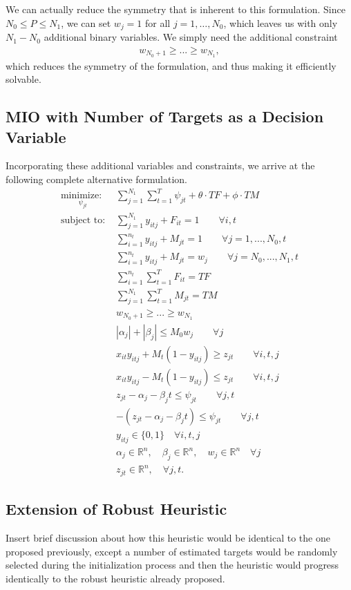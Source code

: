 We can actually reduce the symmetry that is inherent to this formulation. Since $N_{0} \leq P \leq N_{1}$, we can set $w_j=1$ for all $j=1,\ldots,N_0$, which leaves us with only $N_1-N_0$ additional binary variables. We simply need the additional constraint
\begin{align*}
w_{N_0+1}\geq ...\geq w_{N_1},
\end{align*}
which reduces the symmetry of the formulation, and thus making it efficiently solvable. 

\subsection{MIO with Number of Targets as a Decision Variable}
Incorporating these additional variables and constraints, we arrive at the following complete alternative formulation.
\begin{align*}
\underset{\psi_{jt}}{\text{minimize: }} & \sum_{j=1}^{N_{1}} \sum_{t=1}^{T} \psi_{jt} + \theta \cdot TF + \phi \cdot TM\\
\text{subject to: }	& \sum_{j=1}^{N_{1}} y_{itj} + F_{it} = 1 \qquad \forall i,t \nonumber\\
				& \sum_{i=1}^{n_{t}} y_{itj} + M_{jt} = 1 \qquad \forall j=1,...,N_{0},t \nonumber \\
				& \sum_{i=1}^{n_{t}} y_{itj} + M_{jt} = w_{j} \qquad \forall j=N_{0},...,N_{1},t \nonumber \\
				& \sum_{i=1}^{n_{t}} \sum_{t=1}^{T} F_{it} = TF \nonumber \\
				& \sum_{j=1}^{N_{1}} \sum_{t=1}^{T} M_{jt} = TM \nonumber \\
				& w_{N_0+1}\geq ...\geq w_{N_1} \nonumber \\
				& |\alpha_{j}|+|\beta_{j}| \leq M_{0}w_{j}\qquad \forall j \nonumber \\
				& x_{it}y_{itj} + M_{t}(1-y_{itj}) \geq z_{jt} \qquad \forall i,t,j \nonumber \\
				& x_{it}y_{itj} - M_{t}(1-y_{itj}) \leq z_{jt} \qquad \forall i,t,j \nonumber \\
				& z_{jt} - \alpha_{j} - \beta_{j}t \leq \psi_{jt} \qquad \forall j,t \nonumber \\
				& -(z_{jt} - \alpha_{j} - \beta_{j}t) \leq \psi_{jt} \qquad \forall j,t \nonumber \\
			 	& y_{itj} \in \{0,1\} \quad \forall i,t,j \nonumber \\
				& \alpha_{j} \in \mathbb{R}^n,\quad \beta_{j} \in \mathbb{R}^n,\quad w_{j} \in \mathbb{R}^n \quad \forall j \nonumber \\
				& z_{jt} \in \mathbb{R}^n, \quad \forall j,t. \nonumber
\end{align*}

\subsection{Extension of Robust Heuristic}
Insert brief discussion about how this heuristic would be identical to the one proposed previously, except a number of estimated targets would be randomly selected during the initialization process and then the heuristic would progress identically to the robust heuristic already proposed.